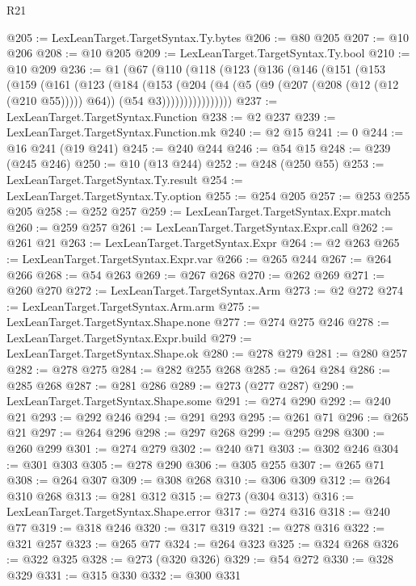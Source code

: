 \begin{lexlean}{R21}
\begin{coremodule}
@205 := LexLeanTarget.TargetSyntax.Ty.bytes
@206 := @80 @205
@207 := @10 @206
@208 := @10 @205
@209 := LexLeanTarget.TargetSyntax.Ty.bool
@210 := @10 @209
@236 := @1
    (@67
      (@110
        (@118
          (@123
            (@136
              (@146
                (@151
                  (@153
                    (@159
                      (@161
                        (@123
                          (@184
                            (@153
                              (@204
                                (@4
                                  (@5 (@9 (@207 (@208 (@12 (@12 (@210 @55))))) @64))
                                  (@54 @3))))))))))))))))
@237 := LexLeanTarget.TargetSyntax.Function
@238 := @2 @237
@239 := LexLeanTarget.TargetSyntax.Function.mk
@240 := @2 @15
@241 := 0
@244 := @16 @241 (@19 @241)
@245 := @240 @244
@246 := @54 @15
@248 := @239 (@245 @246)
@250 := @10 (@13 @244)
@252 := @248 (@250 @55)
@253 := LexLeanTarget.TargetSyntax.Ty.result
@254 := LexLeanTarget.TargetSyntax.Ty.option
@255 := @254 @205
@257 := @253 @255 @205
@258 := @252 @257
@259 := LexLeanTarget.TargetSyntax.Expr.match
@260 := @259 @257
@261 := LexLeanTarget.TargetSyntax.Expr.call
@262 := @261 @21
@263 := LexLeanTarget.TargetSyntax.Expr
@264 := @2 @263
@265 := LexLeanTarget.TargetSyntax.Expr.var
@266 := @265 @244
@267 := @264 @266
@268 := @54 @263
@269 := @267 @268
@270 := @262 @269
@271 := @260 @270
@272 := LexLeanTarget.TargetSyntax.Arm
@273 := @2 @272
@274 := LexLeanTarget.TargetSyntax.Arm.arm
@275 := LexLeanTarget.TargetSyntax.Shape.none
@277 := @274 @275 @246
@278 := LexLeanTarget.TargetSyntax.Expr.build
@279 := LexLeanTarget.TargetSyntax.Shape.ok
@280 := @278 @279
@281 := @280 @257
@282 := @278 @275
@284 := @282 @255 @268
@285 := @264 @284
@286 := @285 @268
@287 := @281 @286
@289 := @273 (@277 @287)
@290 := LexLeanTarget.TargetSyntax.Shape.some
@291 := @274 @290
@292 := @240 @21
@293 := @292 @246
@294 := @291 @293
@295 := @261 @71
@296 := @265 @21
@297 := @264 @296
@298 := @297 @268
@299 := @295 @298
@300 := @260 @299
@301 := @274 @279
@302 := @240 @71
@303 := @302 @246
@304 := @301 @303
@305 := @278 @290
@306 := @305 @255
@307 := @265 @71
@308 := @264 @307
@309 := @308 @268
@310 := @306 @309
@312 := @264 @310 @268
@313 := @281 @312
@315 := @273 (@304 @313)
@316 := LexLeanTarget.TargetSyntax.Shape.error
@317 := @274 @316
@318 := @240 @77
@319 := @318 @246
@320 := @317 @319
@321 := @278 @316
@322 := @321 @257
@323 := @265 @77
@324 := @264 @323
@325 := @324 @268
@326 := @322 @325
@328 := @273 (@320 @326)
@329 := @54 @272
@330 := @328 @329
@331 := @315 @330
@332 := @300 @331

\end{coremodule}
\end{lexlean}
